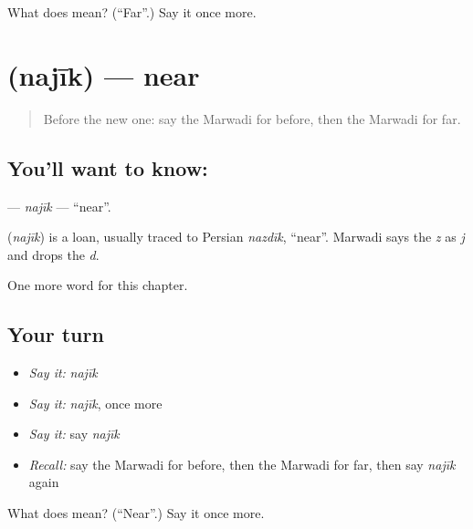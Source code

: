 \begin{tcolorbox}[breakable,colback=teal!4,colframe=teal!35!black,title={Before you move on}]
What does  mean? (\textquotedblleft{}Far\textquotedblright{}.) Say it once more.
\end{tcolorbox}
\section[\texorpdfstring{\mw{नजीक} (najīk)}{नजीक (najīk)}]{ (najīk) — near}

\label{lesson:MW-C81-najik}



\begin{quote}
Before the new one: say the Marwadi for before, then the Marwadi for far.
\end{quote}

\subsection*{You'll want to know: }
\textbf{} — \emph{najīk} — \textquotedblleft{}near\textquotedblright{}.

\begin{cousinweb}
\textbf{} (\emph{najīk}) is a loan, usually traced to Persian \emph{nazdīk}, \textquotedblleft{}near\textquotedblright{}. Marwadi says the \emph{z} as \emph{j} and drops the \emph{d}.
\end{cousinweb}

\begin{grammarlens}[title={What you've built}]
One more word for this chapter.
\end{grammarlens}

\subsection*{Your turn}
\begin{itemize}
\raggedright
  \item \emph{Say it:} \emph{najīk}
  \item \emph{Say it:} \emph{najīk}, once more
  \item \emph{Say it:} say \emph{najīk}
  \item \emph{Recall:} say the Marwadi for before, then the Marwadi for far, then say \emph{najīk} again
\end{itemize}

\begin{tcolorbox}[breakable,colback=teal!4,colframe=teal!35!black,title={Before you move on}]
What does  mean? (\textquotedblleft{}Near\textquotedblright{}.) Say it once more.
\end{tcolorbox}
